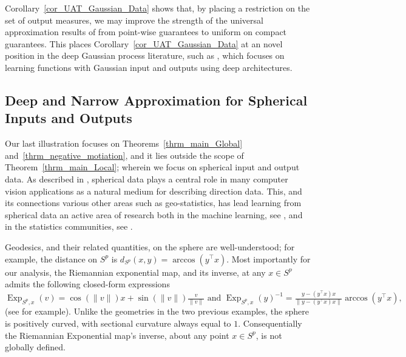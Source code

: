 \documentclass[anon,12pt]{colt2021} %
\begin{document}
\begin{remark}
\label{remark_measure_valued_improvement}
Corollary~\ref{cor_UAT_Gaussian_Data} shows that, by placing a restriction on the set of output measures, we may improve the strength of the universal approximation results of \cite{lu2020universal,pmlr-v119-perekrestenko20a} from point-wise guarantees to uniform on compact guarantees.  This places Corollary~\ref{cor_UAT_Gaussian_Data} at an novel position in the deep Gaussian process literature, such as \cite{pmlr-v31-damianou13a,MR3874162}, which focuses on learning functions with Gaussian input and outputs using deep architectures.
\end{remark}

	


\subsection{Deep and Narrow Approximation for Spherical Inputs and Outputs}\label{ss_UAT_Sphereical}
Our last illustration focuses on Theorems~\ref{thrm_main_Global} and~\ref{thrm_negative_motiation}, and it lies outside the scope of Theorem~\ref{thrm_main_Local}; wherein we focus on spherical input and output data.  
As described in \cite{pmlr-v38-straub15}, spherical data plays a central role in many computer vision applications as a natural medium for describing direction data.  This, and its connections various other areas such as geo-statistics, has lead learning from spherical data an active area of research both in the machine learning, see \cite{pmlr-v119-dutordoir20a,JMLR:v8:hamsici07a}, and in the statistics communities, see \cite{MR3852654}.  

Geodesics, and their related quantities, on the sphere are well-understood; for example, the distance on $S^p$ is $d_{S^p}(x,y)=\arccos{(y^{\top}x)}.$
Most importantly for our analysis, the Riemannian exponential map, and its inverse, at any $x \in S^p$ admits the following closed-form expressions 
$%
\operatorname{Exp}_{S^p,x}(v) 
=
\cos(\|v\|)x + \sin(\|v\|)\frac{v}{\|v\|}
\mbox{ and }
\operatorname{Exp}_{S^p,x}(y)^{-1}
=
\frac{y - (y^{\top}x)x}{\|y - (y^{\top}x)x\|}\arccos{(y^{\top}x)}
,
$ %
 (see \citep[page 3341]{MR3852654} for example).  Unlike the geometries in the two previous examples, the sphere is positively curved, with sectional curvature always equal to $1$.  Consequentially the Riemannian Exponential map's inverse, about any point $x \in S^p$, is not globally defined.  
\end{document}
